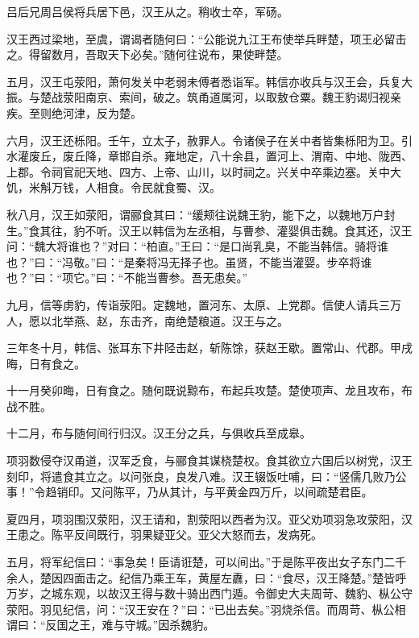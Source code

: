 \documentclass[12pt,UTF8]{ctexbook}
\begin{document}
吕后兄周吕侯将兵居下邑，汉王从之。稍收士卒，军砀。



汉王西过梁地，至虞，谓谒者随何曰：“公能说九江王布使举兵畔楚，项王必留击之。得留数月，吾取天下必矣。”随何往说布，果使畔楚。



五月，汉王屯荥阳，萧何发关中老弱未傅者悉诣军。韩信亦收兵与汉王会，兵复大振。与楚战荥阳南京、索间，破之。筑甬道属河，以取敖仓粟。魏王豹谒归视亲疾。至则绝河津，反为楚。



六月，汉王还栎阳。壬午，立太子，赦罪人。令诸侯子在关中者皆集栎阳为卫。引水灌废丘，废丘降，章邯自杀。雍地定，八十余县，置河上、渭南、中地、陇西、上郡。令祠官祀天地、四方、上帝、山川，以时祠之。兴关中卒乘边塞。关中大饥，米斛万钱，人相食。令民就食蜀、汉。



秋八月，汉王如荥阳，谓郦食其曰：“缓颊往说魏王豹，能下之，以魏地万户封生。”食其往，豹不听。汉王以韩信为左丞相，与曹参、灌婴俱击魏。食其还，汉王问：“魏大将谁也？”对曰：“柏直。”王曰：“是口尚乳臭，不能当韩信。骑将谁也？”曰：“冯敬。”曰：“是秦将冯无择子也。虽贤，不能当灌婴。步卒将谁也？”曰：“项它。”曰：“不能当曹参。吾无患矣。”



九月，信等虏豹，传诣荥阳。定魏地，置河东、太原、上党郡。信使人请兵三万人，愿以北举燕、赵，东击齐，南绝楚粮道。汉王与之。



三年冬十月，韩信、张耳东下井陉击赵，斩陈馀，获赵王歇。置常山、代郡。甲戌晦，日有食之。



十一月癸卯晦，日有食之。随何既说黥布，布起兵攻楚。楚使项声、龙且攻布，布战不胜。



十二月，布与随何间行归汉。汉王分之兵，与俱收兵至成皋。



项羽数侵夺汉甬道，汉军乏食，与郦食其谋桡楚权。食其欲立六国后以树党，汉王刻印，将遣食其立之。以问张良，良发八难。汉王辍饭吐哺，曰：“竖儒几败乃公事！”令趋销印。又问陈平，乃从其计，与平黄金四万斤，以间疏楚君臣。



夏四月，项羽围汉荥阳，汉王请和，割荥阳以西者为汉。亚父劝项羽急攻荥阳，汉王患之。陈平反间既行，羽果疑亚父。亚父大怒而去，发病死。



五月，将军纪信曰：“事急矣！臣请诳楚，可以间出。”于是陈平夜出女子东门二千余人，楚因四面击之。纪信乃乘王车，黄屋左纛，曰：“食尽，汉王降楚。”楚皆呼万岁，之城东观，以故汉王得与数十骑出西门遁。令御史大夫周苛、魏豹、枞公守荥阳。羽见纪信，问：“汉王安在？”曰：“已出去矣。”羽烧杀信。而周苛、枞公相谓曰：“反国之王，难与守城。”因杀魏豹。
\end{document}
